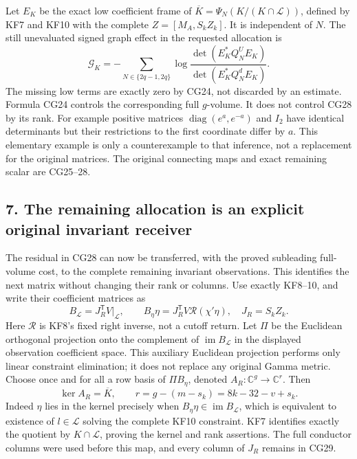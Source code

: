 \documentclass[11pt]{article}
\begin{document}
Let \(E_K\) be the exact low coefficient frame of \(\overline K=\Psi_N(K/(K\cap\mathcal L))\), defined by KF7 and KF10 with the complete \(Z=[M_A,S_kZ_k]\). It is independent of \(N\). The still unevaluated signed graph effect in the requested allocation is \[
\mathcal G_K=
-\sum_{N\in\{2q-1,2q\}}
\log\frac{\det(E_K^*Q_N^UE_K)}{\det(E_K^*Q_N^dE_K)}.
\tag{CG28}
\] The missing low terms are exactly zero by CG24, not discarded by an estimate. Formula CG24 controls the corresponding full \(g\)-volume. It does not control CG28 by its rank. For example positive matrices \(\operatorname{diag}(e^a,e^{-a})\) and \(I_2\) have identical determinants but their restrictions to the first coordinate differ by \(a\). This elementary example is only a counterexample to that inference, not a replacement for the original matrices. The original connecting maps and exact remaining scalar are CG25--28.

\subsection{7. The remaining allocation is an explicit original invariant receiver}\label{the-remaining-allocation-is-an-explicit-original-invariant-receiver}

The residual in CG28 can now be transferred, with the proved subleading full-volume cost, to the complete remaining invariant observations. This identifies the next matrix without changing their rank or columns. Use exactly KF8--10, and write their coefficient matrices as \[
B_{\mathcal L}=J_R^{\mathsf T}V\big|_{\mathcal L},\qquad
B_\eta\eta=J_R^{\mathsf T}V\mathcal R(\chi'\eta),
\quad J_R=S_kZ_k.
\tag{CG29}
\] Here \(\mathcal R\) is KF8's fixed right inverse, not a cutoff return. Let \(\Pi\) be the Euclidean orthogonal projection onto the complement of \(\operatorname{im}B_{\mathcal L}\) in the displayed observation coefficient space. This auxiliary Euclidean projection performs only linear constraint elimination; it does not replace any original Gamma metric. Choose once and for all a row basis of \(\Pi B_\eta\), denoted \(A_R:\mathbb C^g\to\mathbb C^r\). Then \[
\ker A_R=\overline K,\qquad
r=g-(m-s_k)=8k-32-v+s_k.
\tag{CG30}
\] Indeed \(\eta\) lies in the kernel precisely when \(B_\eta\eta\in\operatorname{im}B_{\mathcal L}\), which is equivalent to existence of \(l\in\mathcal L\) solving the complete KF10 constraint. KF7 identifies exactly the quotient by \(K\cap\mathcal L\), proving the kernel and rank assertions. The full conductor columns were used before this map, and every column of \(J_R\) remains in CG29.
\end{document}
